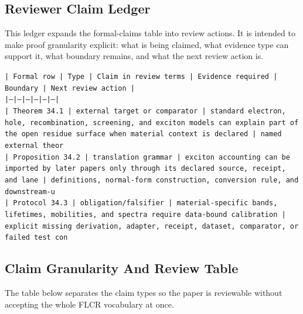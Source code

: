 \documentclass[11pt]{article}
\begin{document}
\subsection*{Reviewer Claim Ledger}

This ledger expands the formal-claims table into review actions. It is intended to make proof granularity explicit: what is being claimed, what evidence type can support it, what boundary remains, and what the next review action is.

\noindent\texttt{| Formal row | Type | Claim in review terms | Evidence required | Boundary | Next review action |}\\
\noindent\texttt{|---|---|---|---|---|---|}\\
\noindent\texttt{| Theorem 34.1 | external target or comparator | standard electron, hole, recombination, screening, and exciton models can explain part of the open residue surface when material context is declared | named external theor}\\
\noindent\texttt{| Proposition 34.2 | translation grammar | exciton accounting can be imported by later papers only through its declared source, receipt, and lane | definitions, normal-form construction, conversion rule, and downstream-u}\\
\noindent\texttt{| Protocol 34.3 | obligation/falsifier | material-specific bands, lifetimes, mobilities, and spectra require data-bound calibration | explicit missing derivation, adapter, receipt, dataset, comparator, or failed test con}\\

\subsection*{Claim Granularity And Review Table}

The table below separates the claim types so the paper is reviewable without accepting the whole FLCR vocabulary at once.
\end{document}
